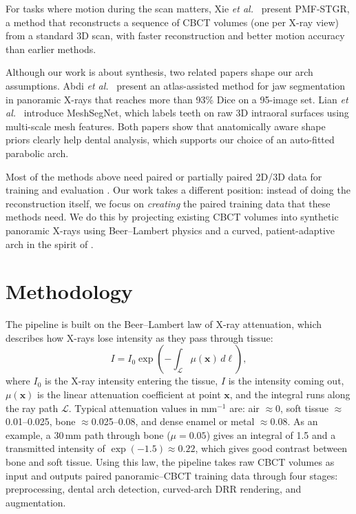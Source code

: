 \documentclass[conference]{IEEEtran}
\begin{document}
For tasks where motion during the scan matters, Xie \emph{et al.}\ \cite{xie2025time} present PMF-STGR, a method that reconstructs a sequence of CBCT volumes (one per X-ray view) from a standard 3D scan, with faster reconstruction and better motion accuracy than earlier methods.

Although our work is about synthesis, two related papers shape our arch assumptions. Abdi \emph{et al.}\ \cite{abdi2015automatic} present an atlas-assisted method for jaw segmentation in panoramic X-rays that reaches more than 93\% Dice on a 95-image set. Lian \emph{et al.}\ \cite{lian2020deep} introduce MeshSegNet, which labels teeth on raw 3D intraoral surfaces using multi-scale mesh features. Both papers show that anatomically aware shape priors clearly help dental analysis, which supports our choice of an auto-fitted parabolic arch.

Most of the methods above need paired or partially paired 2D/3D data for training and evaluation \cite{park2024nebla,parida2025vit,ma2024px2tooth,song2023oral}. Our work takes a different position: instead of doing the reconstruction itself, we focus on \textit{creating} the paired training data that these methods need. We do this by projecting existing CBCT volumes into synthetic panoramic X-rays using Beer--Lambert physics and a curved, patient-adaptive arch in the spirit of \cite{sunilkumar2025panoramic}.

\section{Methodology}
\label{sec:method}

The pipeline is built on the Beer--Lambert law of X-ray attenuation, which describes how X-rays lose intensity as they pass through tissue:
\begin{equation}
I = I_0 \exp\!\left(-\int_{\mathcal{L}} \mu(\mathbf{x})\,d\ell\right),
\label{eq:beer}
\end{equation}
where $I_0$ is the X-ray intensity entering the tissue, $I$ is the intensity coming out, $\mu(\mathbf{x})$ is the linear attenuation coefficient at point $\mathbf{x}$, and the integral runs along the ray path $\mathcal{L}$. Typical attenuation values in mm$^{-1}$ are: air $\approx$0, soft tissue $\approx$0.01--0.025, bone $\approx$0.025--0.08, and dense enamel or metal $\approx$0.08. As an example, a 30\,mm path through bone ($\mu=0.05$) gives an integral of 1.5 and a transmitted intensity of $\exp(-1.5)\approx0.22$, which gives good contrast between bone and soft tissue. Using this law, the pipeline takes raw CBCT volumes as input and outputs paired panoramic--CBCT training data through four stages: preprocessing, dental arch detection, curved-arch DRR rendering, and augmentation.
\end{document}
